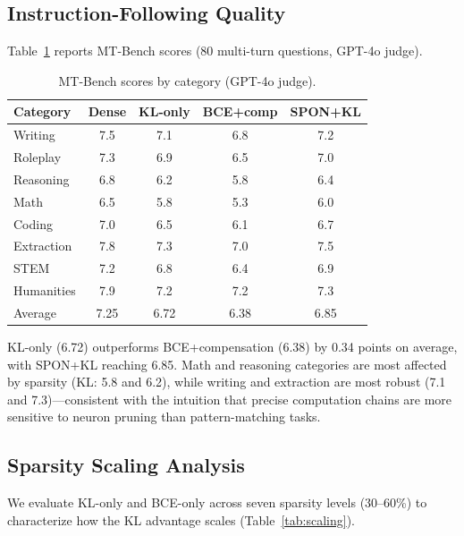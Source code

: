 \documentclass[11pt]{article}
\begin{document}
\subsection{Instruction-Following Quality}
\label{sec:mtbench}

Table~\ref{tab:mtbench} reports MT-Bench scores (80 multi-turn questions, GPT-4o judge).

\begin{table}[t]
\centering
\caption{MT-Bench scores by category (GPT-4o judge).}
\label{tab:mtbench}
\small
\setlength{\tabcolsep}{4pt}
\begin{tabular}{lcccc}
\toprule
Category & Dense & KL-only & BCE+comp & SPON+KL \\
\midrule
Writing & 7.5 & 7.1 & 6.8 & 7.2 \\
Roleplay & 7.3 & 6.9 & 6.5 & 7.0 \\
Reasoning & 6.8 & 6.2 & 5.8 & 6.4 \\
Math & 6.5 & 5.8 & 5.3 & 6.0 \\
Coding & 7.0 & 6.5 & 6.1 & 6.7 \\
Extraction & 7.8 & 7.3 & 7.0 & 7.5 \\
STEM & 7.2 & 6.8 & 6.4 & 6.9 \\
Humanities & 7.9 & 7.2 & 7.2 & 7.3 \\
\midrule
Average & 7.25 & 6.72 & 6.38 & 6.85 \\
\bottomrule
\end{tabular}
\end{table}

KL-only (6.72) outperforms BCE+compensation (6.38) by 0.34 points on average, with SPON+KL reaching 6.85. Math and reasoning categories are most affected by sparsity (KL: 5.8 and 6.2), while writing and extraction are most robust (7.1 and 7.3)---consistent with the intuition that precise computation chains are more sensitive to neuron pruning than pattern-matching tasks.

\subsection{Sparsity Scaling Analysis}
\label{sec:scaling}

We evaluate KL-only and BCE-only across seven sparsity levels (30--60\%) to characterize how the KL advantage scales (Table~\ref{tab:scaling}).
\end{document}
